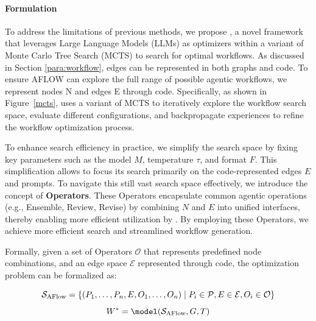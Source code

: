 \paragraph{Formulation}
To address the limitations of previous methods, we propose \model, a novel framework that leverages Large Language Models (LLMs) as optimizers within a variant of Monte Carlo Tree Search (MCTS) to search for optimal workflows. 
As discussed in Section \ref{para:workflow}, edges can be represented in both graphs and code. To ensure AFLOW can explore the full range of possible agentic workflows, we represent nodes N and edges E through code.
Specifically, as shown in Figure~\ref{mcts}, \model uses a variant of MCTS to iteratively explore the workflow search space, evaluate different configurations, and backpropagate experiences to refine the workflow optimization process.


To enhance search efficiency in practice, we simplify the search space by fixing key parameters such as the model $M$, temperature $\tau$, and format $F$. This simplification allows \model to focus its search primarily on the code-represented edges $E$ and prompts. To navigate this still vast search space effectively, we introduce the concept of \textbf{Operators}. These Operators encapsulate common agentic operations (e.g., Ensemble, Review, Revise) by combining $N$ and $E$ into unified interfaces, thereby enabling more efficient utilization by \model. By employing these Operators, we achieve more efficient search and streamlined workflow generation.

Formally, given a set of Operators $\mathcal{O}$ that represents predefined node combinations, and an edge space $\mathcal{E}$ represented through code, the optimization problem can be formalized as:

\begin{equation}
\mathcal{S}_\text{AFlow} = \{ (P_1, \ldots, P_n, E, O_1, \ldots, O_n) \mid P_i \in \mathcal{P}, E \in \mathcal{E}, O_i \in \mathcal{O} \} \\
\end{equation}
\begin{equation}
W^* = \text{\model}(\mathcal{S}_\text{AFlow}, G, T) 
\end{equation}

